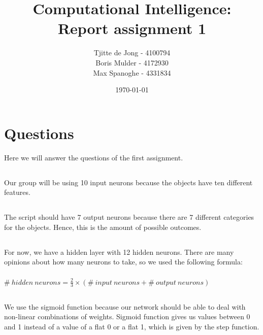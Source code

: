 \documentclass{scrartcl}
\begin{document}
\title{Computational Intelligence:
\\Report assignment 1}
\date{\today{}}

\author{
    \begin{tabular}{l r}
    	\\Tjitte de Jong - 4100794
	\\Boris Mulder - 4172930
        \\Max Spanoghe - 4331834
            \end{tabular}
  }
  
  \maketitle \thispagestyle{empty} \pagebreak
  
  \section{Questions}
  Here we will answer the questions of the first assignment.
  
  \subsection{}
  Our group will be using 10 input neurons because the objects have ten different features.
  
  \subsection{}
  The script should have 7 output neurons because there are 7 different categories for the objects.
  Hence, this is the amount of possible outcomes.
  
  \subsection{}
  For now, we have a hidden layer with 12 hidden neurons. There are many opinions about how many neurons to take, so we used the following formula: \\ \\ $\# \:hidden \:neurons = \frac{2} {3} \times (\# \:input \:neurons + \# \:output \:neurons) $
  
  \subsection{}
  We use the sigmoid function because our network should be able to deal with non-linear combinations of weights. Sigmoid function gives us values between 0 and 1 instead of a value of a flat 0 or a flat 1, which is given by the step function.
  
\end{document}
